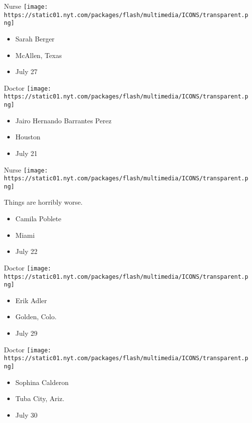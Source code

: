 \protect\hyperlink{item-sarah-berger}{}

Nurse
\texttt{[image: https://static01.nyt.com/packages/flash/multimedia/ICONS/transparent.png]}

\begin{itemize}
\tightlist
\item
  Sarah Berger
\item
  McAllen, Texas
\item
  July 27
\end{itemize}

\protect\hyperlink{item-jairo-hernando-barrantes-perez}{}

Doctor
\texttt{[image: https://static01.nyt.com/packages/flash/multimedia/ICONS/transparent.png]}

\begin{itemize}
\tightlist
\item
  Jairo Hernando Barrantes Perez
\item
  Houston
\item
  July 21
\end{itemize}

\protect\hyperlink{item-camila-poblete}{}

Nurse
\texttt{[image: https://static01.nyt.com/packages/flash/multimedia/ICONS/transparent.png]}

Things are horribly worse.

\begin{itemize}
\tightlist
\item
  Camila Poblete
\item
  Miami
\item
  July 22
\end{itemize}

\protect\hyperlink{item-erik-adler}{}

Doctor
\texttt{[image: https://static01.nyt.com/packages/flash/multimedia/ICONS/transparent.png]}

\begin{itemize}
\tightlist
\item
  Erik Adler
\item
  Golden, Colo.
\item
  July 29
\end{itemize}

\protect\hyperlink{item-sophina-calderon}{}

Doctor
\texttt{[image: https://static01.nyt.com/packages/flash/multimedia/ICONS/transparent.png]}

\begin{itemize}
\tightlist
\item
  Sophina Calderon
\item
  Tuba City, Ariz.
\item
  July 30
\end{itemize}

